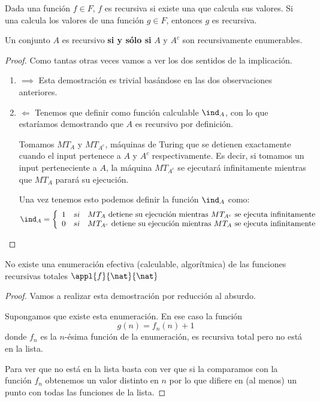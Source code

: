 \begin{theorem}
Dada una función $f\in F$, $f$ es recursiva si existe una \MT que calcula sus valores. Si una \MT calcula los valores de una función $g \in F$, entonces $g$ es recursiva.
\end{theorem}

\begin{theorem}
Un conjunto $A$ es recursivo \textbf{si y sólo si} $A$ y $A^c$ son recursivamente enumerables.
\end{theorem}
\begin{proof}
Como tantas otras veces vamos a ver los dos sentidos de la implicación.
\begin{enumerate}
\item $\implies$
Esta demostración es trivial basándose en las dos observaciones anteriores.

\item $\Longleftarrow$
Tenemos que definir como función calculable $\ind_A$, con lo que estaríamos demostrando que $A$ es recursivo por definición.

Tomamos $MT_A$ y $MT_{A^c}$, máquinas de Turing que se detienen exactamente cuando el input pertenece a $A$ y $A^c$ respectivamente. Es decir, si tomamos un input perteneciente a $A$, la máquina $MT_{A^c}$ se ejecutará infinitamente mientras que $MT_{A}$ parará su ejecución.

Una vez tenemos esto podemos definir la función $\ind_A$ como:
\[\ind_A = \left\{ \begin{array}{lll}
1 & si & MT_A \text{ detiene su ejecución mientras } MT_{A^c} \text{ se ejecuta infinitamente}\\
0 & si & MT_{A^c} \text{ detiene su ejecución mientras } MT_{A} \text{ se ejecuta infinitamente}
\end{array}\right.\]
\end{enumerate}
\end{proof}

\begin{theorem}
No existe una enumeración efectiva (calculable, algorítmica) de las funciones recursivas totales $\appl{f}{\nat}{\nat}$
\end{theorem}
\begin{proof}
Vamos a realizar esta demostración por reducción al absurdo.

Supongamos que existe esta enumeración. En ese caso la función
\[g(n)=f_n(n)+1\]
donde $f_n$ es la $n$-ésima función de la enumeración, es recursiva total pero no está en la lista.

Para ver que no está en la lista basta con ver que si la comparamos con la función $f_n$ obtenemos un valor distinto en $n$ por lo que difiere en (al menos) un punto con todas las funciones de la lista.
\end{proof}

